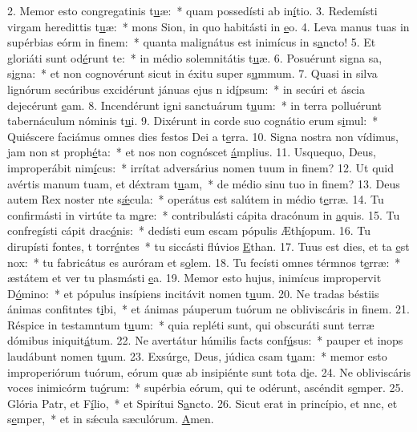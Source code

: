 2. Memor esto congregatinis t\uline{u}æ:~* quam possedísti ab in\uline{í}tio.
3. Redemísti virgam heredittis t\uline{u}æ:~* mons Sion, in quo habitásti in \uline{e}o.
4. Leva manus tuas in supérbias eórm in f\uline{i}nem:~* quanta malignátus est inimícus in s\uline{a}ncto!
5. Et gloriáti sunt  od\uline{é}runt te:~* in médio solemnitátis t\uline{u}æ.
6. Posuérunt signa sa, s\uline{i}gna:~* et non cognovérunt sicut in éxitu super s\uline{u}mmum.
7. Quasi in silva lignórum secúribus excidérunt jánuas ejus n id\uline{í}psum:~* in secúri et áscia dejecérunt \uline{e}am.
8. Incendérunt igni sanctuárum t\uline{u}um:~* in terra polluérunt tabernáculum nóminis t\uline{u}i.
9. Dixérunt in corde suo cognátio erum s\uline{i}mul:~* Quiéscere faciámus omnes dies festos Dei a t\uline{e}rra.
10. Signa nostra non vídimus, jam non st proph\uline{é}ta:~* et nos non cognóscet \uline{á}mplius.
11. Usquequo, Deus, improperábit nim\uline{í}cus:~* irrítat adversárius nomen tuum in f\uline{i}nem?
12. Ut quid avértis manum tuam, et déxtram t\uline{u}am,~* de médio sinu tuo in f\uline{i}nem?
13. Deus autem Rex noster nte s\uline{ǽ}cula:~* operátus est salútem in médio t\uline{e}rræ.
14. Tu confirmásti in virtúte ta m\uline{a}re:~* contribulásti cápita dracónum in \uline{a}quis.
15. Tu confregísti cápit drac\uline{ó}nis:~* dedísti eum escam pópulis Æth\uline{í}opum.
16. Tu dirupísti fontes, t torr\uline{é}ntes~* tu siccásti flúvios \uline{E}than.
17. Tuus est dies, et ta \uline{e}st nox:~* tu fabricátus es auróram et s\uline{o}lem.
18. Tu fecísti omnes térmnos t\uline{e}rræ:~* æstátem et ver tu plasmásti \uline{e}a.
19. Memor esto hujus, inimícus impropervit D\uline{ó}mino:~* et pópulus insípiens incitávit nomen t\uline{u}um.
20. Ne tradas béstiis ánimas confitntes t\uline{i}bi,~* et ánimas páuperum tuórum ne obliviscáris in f\uline{i}nem.
21. Réspice in testamntum t\uline{u}um:~* quia repléti sunt, qui obscuráti sunt terræ dómibus iniquit\uline{á}tum.
22. Ne avertátur húmilis facts conf\uline{ú}sus:~* pauper et inops laudábunt nomen t\uline{u}um.
23. Exsúrge, Deus, júdica csam t\uline{u}am:~* memor esto improperiórum tuórum, eórum quæ ab insipiénte sunt tota d\uline{i}e.
24. Ne obliviscáris voces inimicórm tu\uline{ó}rum:~* supérbia eórum, qui te odérunt, ascéndit s\uline{e}mper.
25. Glória Patr, et F\uline{í}lio,~* et Spirítui S\uline{a}ncto.
26. Sicut erat in princípio, et nnc, et s\uline{e}mper,~* et in sǽcula sæculórum. \uline{A}men.
